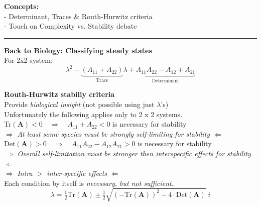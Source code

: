 \documentclass{article}
\newcommand{\ind}{\-\hspace{1cm}}
\begin{document}
\noindent{}

\textbf{Concepts:}\\
\ind - Determinant, Traces \& Routh-Hurwitz criteria\\
\ind - Touch on Complexity vs. Stability debate

\rule[0.5ex]{\linewidth}{1pt}

\textbf{Back to Biology:  Classifying steady states}\\
For 2x2 system:
\begin{equation*}
	\lambda^2 - \underbrace{(A_{11}+A_{22})}_{\text{Trace}}\lambda + \underbrace{A_{11}A_{22} - A_{12}+A_{21}}_{\text{Determinant}}
\end{equation*}

\textbf{Routh-Hurwitz stabiliy criteria}\\
\ind \ind Provide \emph{biological insight} (not possible using just $\lambda$'s)\\
\ind \ind Unfortunately the following applies only to 2 x 2 systems.\\

\ind Tr$(\mathbf{A})<0 \quad \Rightarrow \quad A_{11}+A_{22}<0$ is necessary for stability\\
\ind \ind $\Rightarrow$ \emph{At least some species must be strongly self-limiting for stability} $\Leftarrow$ \\

\ind Det$(\mathbf{A})>0  \quad \Rightarrow \quad A_{11} A_{22} - A_{12} A_{21} > 0$ is necessary for stability\\
\ind \ind $\Rightarrow$ \emph{Overall self-limitation must be stronger then interspecific effects for stability} $\Leftarrow$\\
\ind \ind $\Rightarrow$ \emph{Intra $>$ inter-specific effects} $\Leftarrow$ \\

Each condition by itself is \emph{necessary, but not sufficient}.
\begin{equation*}
	\lambda = \tfrac{1}{2}\text{Tr}(\textbf{A}) \pm \tfrac{1}{2}\sqrt{(-\text{Tr}(\textbf{A}))^2 - 4\cdot\text{Det}(\textbf{A})} \; i
\end{equation*}
\end{document}
